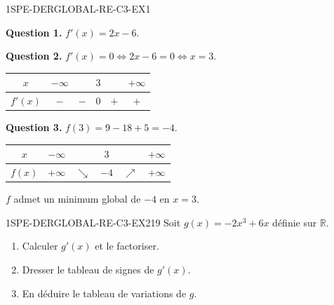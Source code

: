 \begin{corrige}{1SPE-DERGLOBAL-RE-C3-EX1}

\textbf{Question 1.}
$f'(x) = 2x - 6.$

\textbf{Question 2.}
$f'(x) = 0 \Leftrightarrow 2x - 6 = 0 \Leftrightarrow x = 3.$

\begin{center}
\begin{tabular}{|c|ccccc|}
\hline
$x$ & $-\infty$ & & $3$ & & $+\infty$ \\
\hline
$f'(x)$ & $-$ & $-$ & $0$ & $+$ & $+$ \\
\hline
\end{tabular}
\end{center}


\textbf{Question 3.}
$f(3) = 9 - 18 + 5 = -4.$

\begin{center}
\begin{tabular}{|c|ccccc|}
\hline
$x$ & $-\infty$ & & $3$ & & $+\infty$ \\
\hline
$f(x)$ & $+\infty$ & $\searrow$ & $-4$ & $\nearrow$ & $+\infty$ \\
\hline
\end{tabular}
\end{center}

$f$ admet un minimum global de $-4$ en $x = 3$.

\end{corrige}


\begin{exercice}{1SPE-DERGLOBAL-RE-C3-EX2}{1}{9}
Soit $g(x) = -2x^3 + 6x$ définie sur $\mathbb{R}$.
\begin{enumerate}
  \item Calculer $g'(x)$ et le factoriser.
  \item Dresser le tableau de signes de $g'(x)$.
  \item En déduire le tableau de variations de $g$.
\end{enumerate}
\end{exercice}


